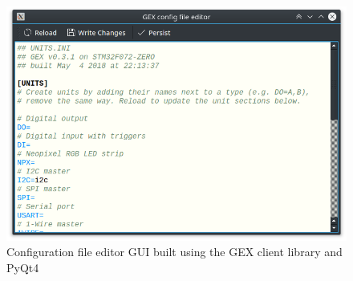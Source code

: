 \begin{figure}
	\centering
	\includegraphics[width=.8\textwidth] {img/gexync.png}
	\caption[Configuration file editor GUI]{\label{fig:gexync}Configuration file editor GUI built using the GEX client library and PyQt4}
\end{figure}



















